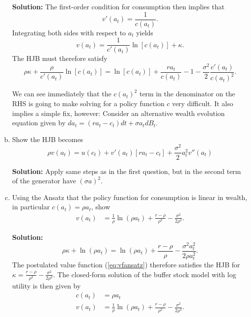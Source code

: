 \documentclass[11pt]{extarticle}
\theoremstyle{plain}
\theoremstyle{definition}
\begin{document}
\begin{enumerate}[(a)]
\textbf{Solution:}
The first-order condition for consumption then implies that 
\begin{equation}
	v'(a_t) = \frac{1}{c(a_t)}.
\end{equation}
Integrating both sides with respect to $a_t$ yields
\begin{equation}\label{eq:vfansatz}
	v(a_t) = \frac{1}{c'(a_t)} \ln[c(a_t)] + \kappa.
\end{equation}
The HJB must therefore satisfy 
\begin{equation*}
	\rho \kappa + \frac{\rho}{c'(a_t)} \ln[c(a_t)] = \ln[c(a_t)] + \frac{r a_t}{c(a_t)} - 1 - \frac{\sigma^2}{2} \frac{c'(a_t)}{c(a_t)^2}.
\end{equation*}

 We can see immediately that the $c(a_t)^2$ term in the denominator on the RHS is going to make solving for a policy function $c$ very difficult. It also implies a simple fix, however: Consider an alternative wealth evolution equation given by $da_t = (r a_t - c_t)dt + \sigma a_t dB_t$. 
\item Show the HJB becomes $$\rho v(a_t) = u(c_t) + v'(a_t)[ra_t -c_t] + \frac{\sigma^2}{2} a_t^2 v''(a_t)$$ 

\textbf{Solution:} Apply same steps as in the first question, but in the second term of the generator have $(\sigma a)^2$.

\item Using the Ansatz that the policy function for consumption is linear in wealth, in particular $c(a_t) = \rho a_t$, show \begin{align}
	v(a_t) &= \frac{1}{\rho} \ln(\rho a_t) + \frac{r - \rho}{\rho^2} - \frac{\sigma^2}{2\rho^2}.
\end{align} 

\textbf{Solution:}
\begin{equation*}
	\rho \kappa + \ln(\rho a_t) = \ln(\rho a_t) + \frac{r-\rho}{\rho} - \frac{\sigma^2a_t^2}{2 \rho a_t^2}.
\end{equation*}
The postulated value function (\ref{eq:vfansatz}) therefore satisfies the HJB for $\kappa = \frac{r - \rho}{\rho^2} - \frac{\sigma^2}{2\rho^2}$. The closed-form solution of the buffer stock model with log utility is then given by 
\begin{align}
	c(a_t) &= \rho a_t \\
	v(a_t) &= \frac{1}{\rho} \ln(\rho a_t) + \frac{r - \rho}{\rho^2} - \frac{\sigma^2}{2\rho^2}.
\end{align} 

\end{enumerate}
\end{document}
